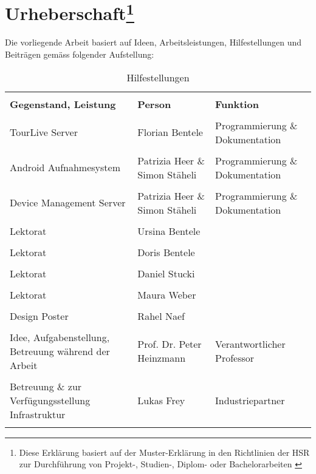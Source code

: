 \chapter*{Urheberschaft\footnote{Diese Erklärung basiert auf der Muster-Erklärung in den Richtlinien der HSR zur Durchführung
von Projekt-, Studien-, Diplom- oder Bachelorarbeiten \cite{hsrerklaerung}}}


Die vorliegende Arbeit basiert auf Ideen, Arbeitsleistungen, Hilfestellungen und Beiträgen gemäss folgender Aufstellung:

\begin{longtable}{p{4cm}|p{4cm}|p{4cm}}
 & &  \\ [-1.5ex]
\textbf{Gegenstand, Leistung} & \textbf{Person} & \textbf{Funktion} \\ [1ex] \hline \hline & &  \\ [-1.5ex]
TourLive Server & Florian Bentele & Programmierung \& Dokumentation \\ [1ex] \hline & &  \\ [-1.5ex]
Android Aufnahmesystem & Patrizia Heer \& Simon Stäheli & Programmierung \& Dokumentation \\ [1ex] \hline & &  \\ [-1.5ex]
Device Management Server & Patrizia Heer \& Simon Stäheli & Programmierung \& Dokumentation \\ [1ex] \hline & &  \\ [-1.5ex]
Lektorat & Ursina Bentele &  \\ [1ex] \hline & &  \\ [-1.5ex]
Lektorat & Doris Bentele &  \\ [1ex] \hline & &  \\ [-1.5ex]
Lektorat & Daniel Stucki &  \\ [1ex] \hline & &  \\ [-1.5ex]
Lektorat & Maura Weber &  \\ [1ex] \hline & &  \\ [-1.5ex]
Design Poster & Rahel Naef &  \\ [1ex] \hline & &  \\ [-1.5ex]
Idee, Aufgabenstellung, Betreuung während der Arbeit & Prof. Dr. Peter Heinzmann & Verantwortlicher Professor \\ [1ex] \hline & &  \\ [-1.5ex]
Betreuung \& zur Verfügungsstellung Infrastruktur & Lukas Frey & Industriepartner \\ [1ex] 
\caption{Hilfestellungen}
\end{longtable} 


